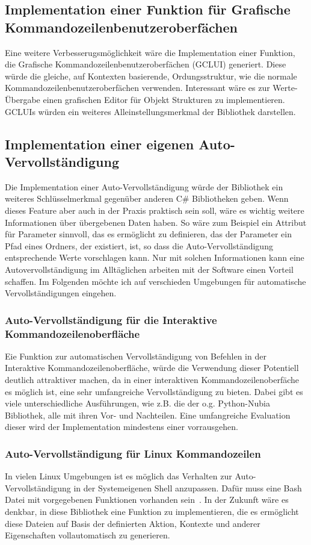 \subsection{Implementation einer Funktion für Grafische Kommandozeilenbenutzeroberfächen}
Eine weitere Verbesserugsmöglichkeit wäre die Implementation einer Funktion, die Grafische Kommandozeilenbenutzeroberfächen (GCLUI) generiert.
Diese würde die gleiche, auf Kontexten basierende, Ordungsstruktur, wie die normale Kommandozeilenbenutzeroberfächen verwenden.
Interessant wäre es zur Werte-\"Ubergabe einen grafischen Editor für Objekt Strukturen zu implementieren.
GCLUIs würden ein weiteres Alleinstellungsmerkmal der Bibliothek darstellen.
\subsection{Implementation einer eigenen Auto-Vervollständigung}\label{subsec:Autocomplete}
Die Implementation einer Auto-Vervollständigung würde der Bibliothek ein weiteres Schlüsselmerkmal gegenüber anderen C\# Bibliotheken geben.
Wenn dieses Feature aber auch in der Praxis praktisch sein soll, wäre es wichtig weitere Informationen über übergebenen Daten haben.
So wäre zum Beispiel ein Attribut für Parameter sinnvoll, das es ermöglicht zu definieren, das der Parameter ein Pfad eines Ordners, 
der existiert, ist, so dass die Auto-Vervollständigung entsprechende Werte vorschlagen kann.
Nur mit solchen Informationen kann eine Autovervollständigung im Alltäglichen arbeiten mit der Software einen Vorteil schaffen.
Im Folgenden möchte ich auf verschieden Umgebungen für automatische Vervollständigungen eingehen.
\subsubsection{Auto-Vervollständigung für die Interaktive Kommandozeilenoberfläche}
Eie Funktion zur automatischen Vervollständigung von Befehlen in der Interaktive Kommandozeilenoberfläche, würde die Verwendung dieser Potentiell deutlich attraktiver machen, 
da in einer interaktiven Kommandozeilenoberfäche es möglich ist, eine sehr umfangreiche Vervollständigung zu bieten.
Dabei gibt es viele unterschiedliche  Ausführungen, wie z.B. die der o.g. Python-Nubia Bibliothek, alle mit ihren Vor- und Nachteilen.
Eine umfangreiche Evaluation dieser wird der Implementation mindestens einer vorrausgehen. 
\subsubsection{Auto-Vervollständigung für Linux Kommandozeilen}
In vielen Linux Umgebungen ist es möglich das Verhalten zur Auto-Vervollständigung in der Systemeigenen Shell anzupassen.
Dafür muss eine Bash Datei mit vorgegebenen Funktionen vorhanden sein~\cite{BashAutoComplete}.
In der Zukunft wäre es denkbar, in diese Bibliothek eine Funktion zu implementieren, die es ermöglicht diese Dateien auf Basis der definierten Aktion,
Kontexte und anderer Eigenschaften vollautomatisch zu generieren.
